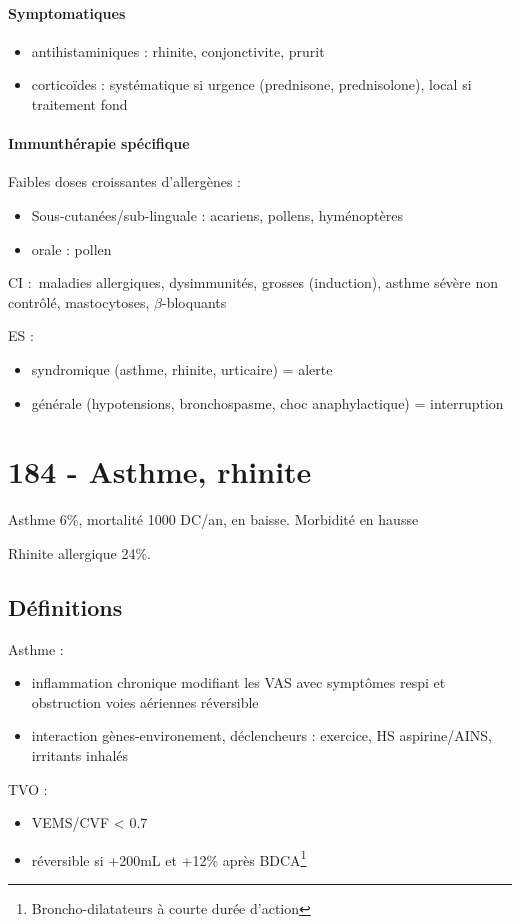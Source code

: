 \paragraph{Symptomatiques}
\begin{itemize}
\item antihistaminiques : rhinite, conjonctivite, prurit
\item corticoïdes : systématique si urgence (prednisone, prednisolone), local
  si traitement fond
\end{itemize}

\paragraph{Immunthérapie spécifique}
Faibles doses croissantes d'allergènes :
\begin{itemize}
\item Sous-cutanées/sub-linguale : acariens, pollens, hyménoptères
\item orale : pollen
\end{itemize}
CI : maladies allergiques, dysimmunités, grosses (induction), asthme sévère non
contrôlé, mastocytoses, $\beta$-bloquants

ES : 
\begin{itemize}
\item syndromique (asthme, rhinite, urticaire) = alerte
\item générale (hypotensions, bronchospasme, choc anaphylactique) =
  interruption
\end{itemize}


\section{184 - Asthme, rhinite}
Asthme 6\%, mortalité 1000 DC/an, en baisse. Morbidité en hausse

Rhinite allergique 24\%.
\subsection{Définitions}
Asthme : 
\begin{itemize}
\item inflammation chronique modifiant les VAS avec symptômes respi et obstruction voies aériennes réversible
\item interaction gènes-environement, déclencheurs : exercice, HS aspirine/AINS,
  irritants inhalés
\end{itemize}

TVO : 
\begin{itemize}
\item \gls{VEMS}/CVF < 0.7
\item réversible si +200mL et +12\% après BDCA\footnote{Broncho-dilatateurs à courte durée
    d'action}
\end{itemize}

